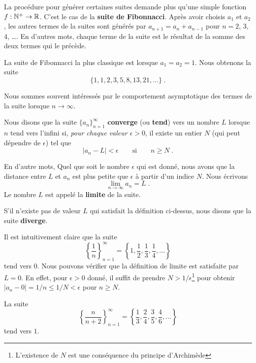 {\begin{egg}
La procédure pour générer certaines suites demande plus qu'une simple
fonction $f:\mathbb{N}^+ \rightarrow \mathbb{R}$.  C'est le cas de la
{\bfseries suite de Fibonnacci}.  Après avoir choisis $a_1$ et $a_2$, les
autres termes de la suites sont générés par $a_{n+1} = a_n + a_{n-1}$
pour $n=2$, $3$, $4$, \ldots.  En d'autres mots, chaque terme de la
suite est le résultat de la somme des deux termes qui le précède.

La suite de Fibonnacci la plus classique est lorsque $a_1=a_2=1$.  Nous
obtenons la suite
\[
\{ 1, 1, 2, 3, 5, 8, 13, 21, \ldots \}\; .
\]
\end{egg}

Nous sommes souvent intéressés par le comportement asymptotique des
termes de la suite lorsque $n\rightarrow \infty$.

\begin{focus}[\theory]{\dfn} 
Nous disons que la suite $\{ a_n\}_{n=1}^\infty$ {\bfseries converge}
(ou {\bfseries tend}) vers un nombre $L$
lorsque $n$ tend vers l'infini si,
{\em pour chaque valeur $\epsilon >0$}, il existe un 
entier $N$ (qui peut dépendre de $\epsilon$) tel que
\[
|a_n-L| < \epsilon \qquad \text{si} \qquad n \geq N \; .
\]

En d'autre mots, Quel que soit le nombre $\epsilon$ qui est donné, nous
avons que la distance entre $L$ et $a_n$ est plus petite que $\epsilon$ à
partir d'un indice $N$.  Nous écrivons
\[
\lim_{n\rightarrow \infty} a_n = L \; .
\]
Le nombre $L$ est appelé la {\bfseries limite} de la
suite.

S'il n'existe pas de valeur $L$ qui satisfait la définition ci-dessus,
nous disons que la suite {\bfseries diverge}.
\end{focus}

\begin{egg}[\theory]
Il est intuitivement claire que la suite
\[
\left\{ \frac{1}{n} \right\}_{n=1}^\infty
= \left\{ 1 , \frac{1}{2}, \frac{1}{3}, \frac{1}{4}, \ldots \right\}
\]
tend vers $0$.  Nous pouvons vérifier que la définition de limite est
satisfaite par $L=0$.  En effet, pour $\epsilon >0$ donné, il suffit
de prendre $N > 1/\epsilon$\footnote{L'existence de $N$ est une
conséquence du principe d'Archimède} pour obtenir
$|a_n - 0| = 1/n \leq 1/N < \epsilon$ pour $n \geq N$.
\end{egg}

\begin{egg}[\theory]
La suite
\[
\left\{\frac{n}{n+2}\right\}_{n=1}^\infty
= \left\{ \frac{1}{3}, \frac{2}{4}, \frac{3}{5}, \frac{4}{6}, \ldots
\right\}
\]
tend vers $1$.


\end{egg}}
